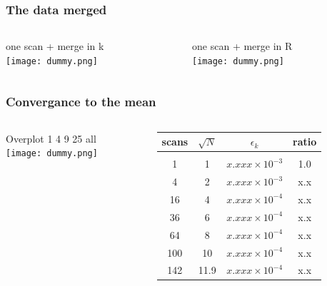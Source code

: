 \documentclass[10pt, xcolor=x11names, compress]{beamer}
\begin{document}
\begin{frame}
  \frametitle{The data merged}
  \begin{columns}[T]
    \begin{column}{0.5\linewidth}
      one scan + merge in k\\
      \texttt{[image: dummy.png]}      
    \end{column}
    \begin{column}{0.5\linewidth}
      one scan + merge in R\\
      \texttt{[image: dummy.png]}      
    \end{column}
  \end{columns}
\end{frame}

\begin{frame}
  \frametitle{Convergance to the mean}
  \begin{columns}[T]
    \begin{column}{0.5\linewidth}
      Overplot 1 4 9 25 all\\
      \texttt{[image: dummy.png]}
    \end{column}
    \begin{column}{0.5\linewidth}
      \begin{tabular}[h]{cccc}
        scans & $\sqrt{N}$ & $\epsilon_k$ & ratio \\
        \hline\\
        1   & 1  & $x.xxx\times 10^{-3}$ & 1.0 \\
        4   & 2  & $x.xxx\times 10^{-3}$ & x.x \\
        16  & 4  & $x.xxx\times 10^{-4}$ & x.x \\
        36  & 6  & $x.xxx\times 10^{-4}$ & x.x \\
        64  & 8  & $x.xxx\times 10^{-4}$ & x.x \\
        100 & 10 & $x.xxx\times 10^{-4}$ & x.x \\
        142 & 11.9 & $x.xxx\times 10^{-4}$ & x.x
      \end{tabular}
    \end{column}
  \end{columns}
\end{frame}
\end{document}
